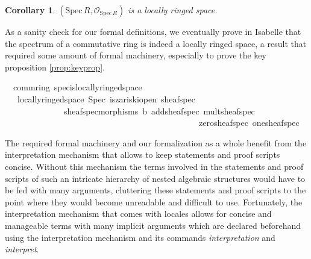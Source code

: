 \documentclass[12pt]{scrartcl}
\newtheorem{cor}[proposition]{Corollary}
\def\spec{\text{Spec}\,R}
\begin{document}
\begin{cor}
	$(\text{Spec}\,R, \mathscr{O}_{\spec})$ is a locally ringed space.
\end{cor}

As a sanity check for our formal definitions, we eventually prove in Isabelle that the spectrum of a commutative ring is indeed a locally ringed space, a result that required some amount of formal machinery, especially to prove the key proposition \ref{prop:keyprop}.

\begin{isabelle}
\isamarkupfalse%
\ {\isacharparenleft}{\kern0pt}\ comm{\isacharunderscore}{\kern0pt}ring{\isacharparenright}{\kern0pt}\ spec{\isacharunderscore}{\kern0pt}is{\isacharunderscore}{\kern0pt}locally{\isacharunderscore}{\kern0pt}ringed{\isacharunderscore}{\kern0pt}space{\isacharcolon}{\kern0pt}\isanewline
\ \ \ {\isachardoublequoteopen}locally{\isacharunderscore}{\kern0pt}ringed{\isacharunderscore}{\kern0pt}space\ Spec\ is{\isacharunderscore}{\kern0pt}zariski{\isacharunderscore}{\kern0pt}open\ sheaf{\isacharunderscore}{\kern0pt}spec\ \isanewline
\ \ \ \ \ \ \ \ \ \ \ \ \ \ sheaf{\isacharunderscore}{\kern0pt}spec{\isacharunderscore}{\kern0pt}morphisms\ {\isasymO}b\ add{\isacharunderscore}{\kern0pt}sheaf{\isacharunderscore}{\kern0pt}spec\ mult{\isacharunderscore}{\kern0pt}sheaf{\isacharunderscore}{\kern0pt}spec\ \isanewline
\ \ \ \ \ \ \ \ \ \ \ \ \ \ \ \ \ \ \ \ \ \ \ \ \ \ \ \ \ \ \ \ \ \ \ \ \ \ \ \ \ \ \ \ \ \ zero{\isacharunderscore}{\kern0pt}sheaf{\isacharunderscore}{\kern0pt}spec\ one{\isacharunderscore}{\kern0pt}sheaf{\isacharunderscore}{\kern0pt}spec{\isachardoublequoteclose}
\end{isabelle}

The required formal machinery and our formalization as a whole benefit from the interpretation mechanism that allows to keep statements and proof scripts concise. Without this mechanism the terms involved in the statements and proof scripts of such an intricate hierarchy of nested algebraic structures would have to be fed with many arguments, cluttering these statements and proof scripts to the point where they would become unreadable and difficult to use. Fortunately, the interpretation mechanism that comes with locales allows for concise and manageable terms with many implicit arguments which are declared beforehand using the interpretation mechanism and its commands \textit{interpretation} and \textit{interpret}.
  
\end{document}
